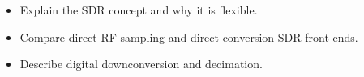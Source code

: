\begin{objectives}
\begin{itemize}[leftmargin=1.4em,itemsep=2pt]
\item Explain the SDR concept and why it is flexible.
\item Compare direct-RF-sampling and direct-conversion SDR front ends.
\item Describe digital downconversion and decimation.
\end{itemize}
\end{objectives}
